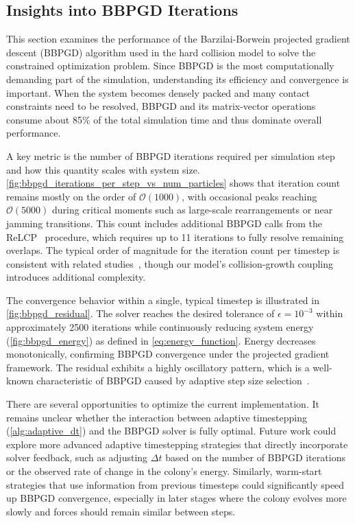 \documentclass[conference]{IEEEtran}
\begin{document}
\subsection{Insights into BBPGD Iterations}

This section examines the performance of the Barzilai-Borwein projected gradient descent (BBPGD) algorithm used in the hard collision model to solve the constrained optimization problem. Since BBPGD is the most computationally demanding part of the simulation, understanding its efficiency and convergence is important. When the system becomes densely packed and many contact constraints need to be resolved, BBPGD and its matrix-vector operations consume about 85\% of the total simulation time and thus dominate overall performance.

A key metric is the number of BBPGD iterations required per simulation step and how this quantity scales with system size. \autoref{fig:bbpgd_iterations_per_step_vs_num_particles} shows that iteration count remains mostly on the order of $\mathcal{O}(1000)$, with occasional peaks reaching $\mathcal{O}(5000)$ during critical moments such as large-scale rearrangements or near jamming transitions. This count includes additional BBPGD calls from the ReLCP~\cite{Weady2024SM} procedure, which requires up to 11 iterations to fully resolve remaining overlaps. The typical order of magnitude for the iteration count per timestep is consistent with related studies~\cite{Yan2019}, though our model's collision-growth coupling introduces additional complexity.

The convergence behavior within a single, typical timestep is illustrated in \autoref{fig:bbpgd_residual}. The solver reaches the desired tolerance of $\epsilon = 10^{-3}$ within approximately 2500 iterations while continuously reducing system energy (\autoref{fig:bbpgd_energy}) as defined in \autoref{eq:energy_function}. Energy decreases monotonically, confirming BBPGD convergence under the projected gradient framework. The residual exhibits a highly oscillatory pattern, which is a well-known characteristic of BBPGD caused by adaptive step size selection~\cite{BBPGD,Schneider2021}.

There are several opportunities to optimize the current implementation. It remains unclear whether the interaction between adaptive timestepping (\autoref{alg:adaptive_dt}) and the BBPGD solver is fully optimal. Future work could explore more advanced adaptive timestepping strategies that directly incorporate solver feedback, such as adjusting $\Delta t$ based on the number of BBPGD iterations or the observed rate of change in the colony's energy. Similarly, warm-start strategies that use information from previous timesteps could significantly speed up BBPGD convergence, especially in later stages where the colony evolves more slowly and forces should remain similar between steps.
\end{document}
